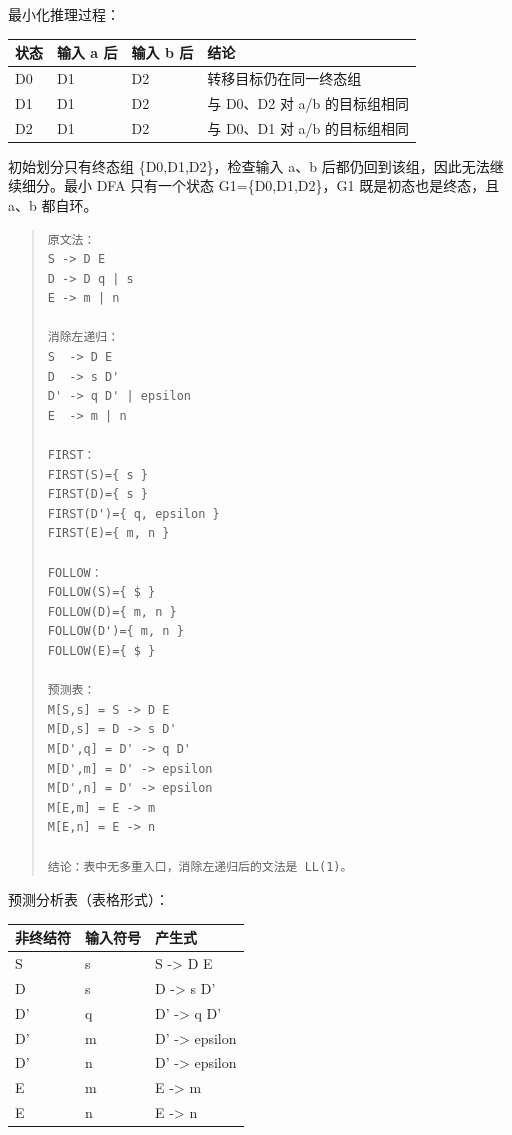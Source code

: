 \documentclass[UTF8,zihao=-4]{ctexart}
\newcommand{\answerquestion}[2]{\par\vspace{0.75em}\noindent{\large\bfseries 题目 #1 #2}\par\vspace{0.35em}}
\begin{document}
最小化推理过程：

\begin{center}
\footnotesize
\begin{tabular}{llll}
\hline
状态 & 输入 a 后 & 输入 b 后 & 结论 \\
\hline
D0 & D1 & D2 & 转移目标仍在同一终态组 \\
D1 & D1 & D2 & 与 D0、D2 对 a/b 的目标组相同 \\
D2 & D1 & D2 & 与 D0、D1 对 a/b 的目标组相同 \\
\hline
\end{tabular}
\end{center}

初始划分只有终态组 \{D0,D1,D2\}，检查输入 a、b 后都仍回到该组，因此无法继续细分。最小 DFA 只有一个状态 G1=\{D0,D1,D2\}，G1 既是初态也是终态，且 a、b 都自环。



\answerquestion{2}{LL 语法分析答案}


\begin{quote}
\footnotesize
\begin{verbatim}
原文法：
S -> D E
D -> D q | s
E -> m | n

消除左递归：
S  -> D E
D  -> s D'
D' -> q D' | epsilon
E  -> m | n

FIRST：
FIRST(S)={ s }
FIRST(D)={ s }
FIRST(D')={ q, epsilon }
FIRST(E)={ m, n }

FOLLOW：
FOLLOW(S)={ $ }
FOLLOW(D)={ m, n }
FOLLOW(D')={ m, n }
FOLLOW(E)={ $ }

预测表：
M[S,s] = S -> D E
M[D,s] = D -> s D'
M[D',q] = D' -> q D'
M[D',m] = D' -> epsilon
M[D',n] = D' -> epsilon
M[E,m] = E -> m
M[E,n] = E -> n

结论：表中无多重入口，消除左递归后的文法是 LL(1)。
\end{verbatim}
\end{quote}

预测分析表（表格形式）：

\begin{center}
\footnotesize
\begin{tabular}{lll}
\hline
非终结符 & 输入符号 & 产生式 \\
\hline
S & s & S -> D E \\
D & s & D -> s D' \\
D' & q & D' -> q D' \\
D' & m & D' -> epsilon \\
D' & n & D' -> epsilon \\
E & m & E -> m \\
E & n & E -> n \\
\hline
\end{tabular}
\end{center}
\end{document}
